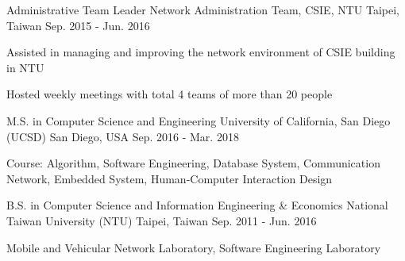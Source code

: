 \documentclass[13pt, a4paper]{awesome-cv}
\begin{document}
\begin{cventries}
    \cventry
        {Administrative Team Leader}
        {Network Administration Team, CSIE, NTU}
        {Taipei, Taiwan}
        {Sep. 2015 - Jun. 2016}
        {
        \begin{cvitems}
            \item {Assisted in managing and improving the network environment of CSIE building in NTU}
            \item {Hosted weekly meetings with total 4 teams of more than 20 people}
        \end{cvitems}
        }
\end{cventries}


\begin{cventries}
    \cventry
        {M.S. in Computer Science and Engineering}
        {University of California, San Diego (UCSD)}
        {San Diego, USA}
        {Sep. 2016 - Mar. 2018}
        {
        \begin{cvitems}
            \item {Course: Algorithm, Software Engineering, Database System, Communication Network, Embedded System, Human-Computer Interaction Design}
        \end{cvitems}
        }
    
    \cventry
        {B.S. in Computer Science and Information Engineering \& Economics}
        {National Taiwan University (NTU)}
        {Taipei, Taiwan}
        {Sep. 2011 - Jun. 2016}
        {
        \begin{cvitems}
            \item {Mobile and Vehicular Network Laboratory, Software Engineering Laboratory}
        \end{cvitems}
        }
\end{cventries}
\end{document}
